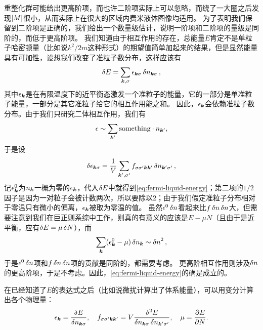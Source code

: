 \documentclass[hyperref, UTF8, a4paper]{ctexart}
\begin{document}
重整化群可能给出更高阶项，而也许二阶项实际上可以忽略，而绕了一大圈之后发现$\abs{M}$很小，从而实际上在很大的区域内费米液体图像均适用。
为了表明我们保留到二阶项是正确的，我们给出一个数量级估计，说明一阶项和二阶项的量级是同阶的，而低于更高阶项。
我们知道由于相互作用的存在，总能量$E$肯定不是单粒子哈密顿量（比如说$k^2/2m$这种形式）的期望值简单加起来的结果，但是显然能量具有可加性，设想我们改变了准粒子数分布，这样应该有
\[
    \var{E} = \sum_{\vb*{k}, \sigma} \epsilon_{\vb*{k} \sigma} \var{n_{\vb*{k} \sigma}},
\]
其中$\epsilon_{\vb*{k}}$是在有限温度下的近平衡态激发一个准粒子的能量，它的一部分是单准粒子能量，一部分是其它准粒子给它的相互作用能之和。
因此，$\epsilon_{\vb*{k}}$会依赖准粒子数分布。由于我们只研究二体相互作用，我们有
\[
    \epsilon \sim \sum_{\vb*{k}'} \text{something} \cdot n_{\vb*{k}'},
\]
于是设
\[
    \var{\epsilon_{\vb*{k} \sigma}} = \frac{1}{V} \sum_{\vb*{k}', \sigma'} f_{\sigma \sigma' \vb*{k} \vb*{k}'} \var{n_{\vb*{k}' \sigma'}},
\]
记$\epsilon_{\vb*{k}}^0$为$n_{\vb*{k}}$一概为零的$\epsilon_{\vb*{k}}$，代入$\var{E}$中就得到\eqref{eq:fermi-liquid-energy}；第二项的$1/2$因子是因为一对粒子会被计数两次，所以要除以$2$；由于我们假定准粒子分布相对于零温只有微小的偏离，$\epsilon_{\vb*{k}}$被取为零温的值。
虽然$\epsilon^0 \var{n}$看起来比$f\var{n} \var{n}$大，但需要注意到我们在巨正则系综中工作，则真的有意义的应该是$E-\mu N$（且由于是近平衡，应有$\var{E} = \mu \var{N}$），而
\[
    \sum_{\vb*{k}} (\epsilon^0_{\vb*{k}} - \mu) \var{n_{\vb*{k}}} \sim \var{n}^2,
\]
于是$\epsilon^0 \var{n}$项和$f\var{n} \var{n}$项的贡献是同阶的，都需要考虑。
更高阶相互作用则涉及$\var{n}$的更高阶项，于是不考虑。因此，\eqref{eq:fermi-liquid-energy}的确是成立的。

在已经知道了$E$的表达式之后（比如说微扰计算出了体系能量），可以用变分计算出各个物理量：
\begin{equation}
    \epsilon_{\vb*{k}} = \fdv{E}{n_{\vb*{k} \sigma}} , \quad f_{\sigma \sigma' \vb*{k} \vb*{k}'} = V \frac{\var[2]{E}}{\var{n_{\vb*{k} \sigma}}\var{n_{\vb*{k}' \sigma'}}}, \quad \mu = \pdv{E}{N}.
\end{equation}
\end{document}
